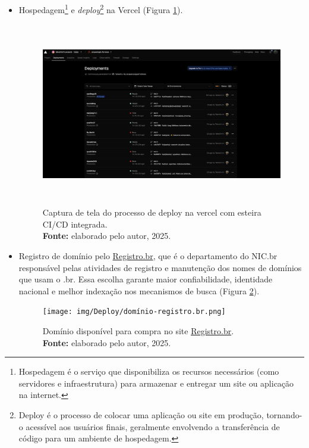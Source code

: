 \begin{itemize}
    \item Hospedagem\footnote{Hospedagem é o serviço que disponibiliza os recursos necessários (como servidores e infraestrutura) para armazenar e entregar um site ou aplicação na internet.} e \textit{deploy}\footnote{Deploy é o processo de colocar uma aplicação ou site em produção, tornando-o acessível aos usuários finais, geralmente envolvendo a transferência de código para um ambiente de hospedagem.} na Vercel (Figura \ref{fig:deploy_vercel}). 
\begin{figure}[H]
    \centering
    \includegraphics[height=8cm, keepaspectratio]{img/Deploy/deploy_vercel.png}
    \caption{ Captura de tela do processo de deploy na vercel com esteira CI/CD integrada. \\
        \textbf{Fonte:} elaborado pelo autor, 2025.}
    \label{fig:deploy_vercel}
\end{figure}

    \item Registro de domínio pelo \href{www.registro.br}{Registro.br}, que é o departamento do NIC.br responsável pelas atividades de registro e manutenção dos nomes de domínios que usam o .br. Essa escolha garante maior confiabilidade, identidade nacional e melhor indexação nos mecanismos de busca (Figura \ref{fig:dominio_registro_br}).
\begin{figure}[H]
    \centering
    \texttt{[image: img/Deploy/domínio-registro.br.png]}
    \caption{ Domínio disponível para compra no site \href{www.registro.br}{Registro.br}. \\
        \textbf{Fonte:} elaborado pelo autor, 2025.}
    \label{fig:dominio_registro_br}
\end{figure}


\end{itemize}
